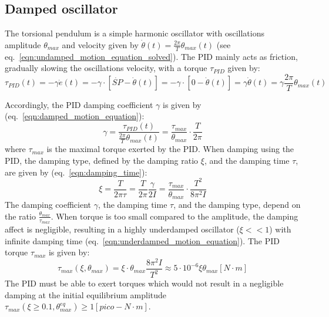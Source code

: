 \documentclass[\main/master.tex]{subfiles}
\begin{document}
\subsection{Damped oscillator}
The torsional pendulum is a simple harmonic oscillator with oscillations amplitude $\theta_{max}$ and velocity given by $\dot{\theta}(t) =\frac{2\pi}{T} \theta_{max}( t)$ (see eq.~\ref{eqn:undamped_motion_equation_solved}). The PID mainly acts as friction, gradually slowing the oscillations velocity, with a torque $\tau_{PID}$ given by:
\begin{equation}
\tau_{PID}(t) = -\gamma\dot{e}(t) =  -\gamma\cdot [\dot{SP} -\dot{\theta}(t)] =-\gamma\cdot [0-\dot{\theta}(t)]  =  \gamma\dot{\theta}(t) =  \gamma\frac{2\pi}{T} \theta_{max}( t) 
\label{eqn:friction_torque_pid}
\end{equation}
\par\noindent
Accordingly, the PID damping coefficient $\gamma$ is given by (eq.~\ref{eqn:damped_motion_equation}):
\begin{equation}
\gamma  =  \frac{\tau_{PID}(t)}{\frac{2\pi}{T} \theta_{max}( t) } =\frac{\tau_{max}}{\theta_{max}}\cdot \frac{ T}{2\pi}          \label{eqn:pid damping coefficient}
\end{equation}
where $\tau_{max}$ is the maximal torque exerted by the PID. When damping using the PID, the damping type, defined by the damping ratio $\xi$, and the damping time $\tau$, are given by (eq.~\ref{eqn:damping_time}):
\begin{equation}
\xi = \frac{T}{2 \pi \tau } =  \frac{T}{2 \pi  }\frac{\gamma}{2I}  = \frac{ \tau_{max}}{\theta_{max}} \cdot \frac{T^2}{8\pi^2 I}  \label{eqn:damping_time_pid}
\end{equation}
The damping coefficient $\gamma$, the damping time $\tau$, and the damping type, depend on the ratio $\frac{\theta_{max}}{\tau_{max}}$. When torque is too small compared to the amplitude, the damping affect is negligible, resulting in a highly underdamped oscillator ($\xi << 1$) with infinite damping time (eq.~\ref{eqn:underdamped_motion_equation}). The PID torque $\tau_{max} $ is given by:
\begin{equation}
\tau_{max} (\xi ,\theta_{max})=\xi\cdot\theta_{max}\frac{ 8 \pi^2 I }{T^2} \approx  5\cdot 10^{-6} \xi\theta_{max}[N\cdot m]
\label{eqn:damping_torque_pid}
\end{equation}
The PID must be able to exert torques which would not result in a negligible damping at the initial equilibrium amplitude $\tau_{max} (\xi\geq 0.1 ,\theta_{max}^{eq})\geq 1[pico-N\cdot m] $. 
 
\end{document}
